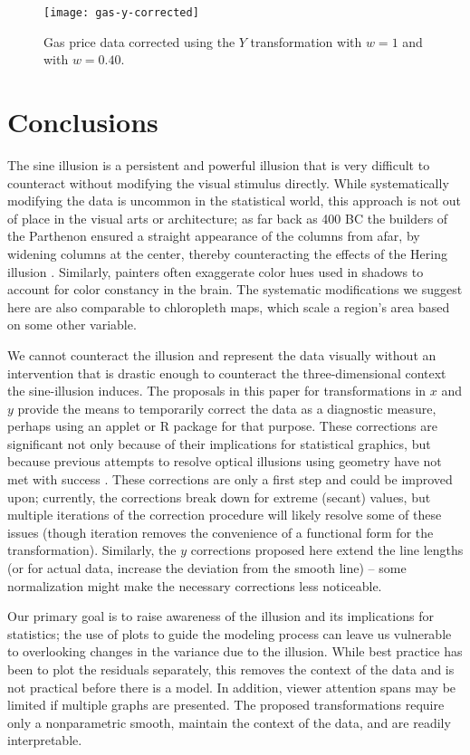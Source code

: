 \documentclass[11pt]{isuthesis}\usepackage[]{graphicx}\usepackage[]{color}
\begin{document}
\begin{figure}[h]
\centering
\texttt{[image: gas-y-corrected]}
\caption[Gas price data, Y transformation]{Gas price data corrected using the $Y$ transformation with $w=1$ and with $w=0.40$. }
\label{fig:gasprices-y-correct}
\end{figure}

\section{Conclusions}
The sine illusion is a persistent and powerful illusion that is very difficult to counteract without modifying the visual stimulus directly. While systematically modifying the data is uncommon in the statistical world, this approach is not out of place in the visual arts or architecture; as far back as 400 BC the builders of the Parthenon ensured a straight appearance of the columns from afar, by widening columns at the center, thereby counteracting the effects of the Hering illusion \citep{naturalscenes,hering}. Similarly, painters often exaggerate color hues used in shadows to account for color constancy in the brain. The systematic modifications we suggest here are also comparable to chloropleth maps, which scale a region's area based on some other variable. 

We cannot counteract the illusion and represent the data visually without an intervention that is drastic enough to counteract the three-dimensional context the sine-illusion induces. The proposals in this paper for transformations in $x$ and $y$ provide the means to temporarily correct the data as a diagnostic measure, perhaps using an applet or R package for that purpose. These corrections are significant not only because of their implications for statistical graphics, but because previous attempts to resolve optical illusions using geometry have not met with success \citep{westheimer2008illusions}. These corrections are only a first step and could be improved upon; currently, the corrections break down for extreme (secant) values, but multiple iterations of the correction procedure will likely resolve some of these issues (though iteration removes the convenience of a functional form for the transformation). Similarly, the $y$ corrections proposed here extend the line lengths (or for actual data, increase the deviation from the smooth line) -- some normalization might make the necessary corrections less noticeable. 

Our primary goal is to raise awareness of the illusion and its implications for statistics; the use of plots to guide the modeling process can leave us vulnerable to overlooking changes in the variance due to the illusion. While best practice has  been to plot the residuals separately, this removes the context of the data and is not practical before there is a model. In addition, viewer attention spans may be limited if multiple graphs are presented. The proposed transformations require only a nonparametric smooth, maintain the context of the data, and are readily interpretable. 
\end{document}

